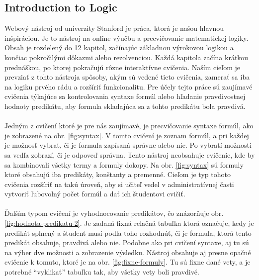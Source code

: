 \subsection{Introduction to Logic}
Webový nástroj od univerzity Stanford \cite{intro_to_logic} je práca, ktorá je našou hlavnou inšpiráciou. Je to nástroj na online výučbu a precvičovanie matematickej logiky. Obsah je rozdelený do 12 kapitol, začínajúc základnou výrokovou logikou a končiac pokročilými dôkazmi alebo rezolvenciou. Každá kapitola začína krátkou prednáškou, po ktorej pokračujú rôzne interaktívne cvičenia. Naším cieľom je prevziať z tohto nástroja spôsoby, akým sú vedené tieto cvičenia, zamerať sa iba na logiku prvého rádu a rozšíriť funkcionalitu. Pre účely tejto práce sú zaujímavé cvičenia týkajúce sa kontrolovania syntaxe formúl alebo hľadanie pravdivostnej hodnoty predikátu, aby formula skladajúca sa z tohto predikátu bola pravdivá.

\paragraph{}
Jedným z cvičení ktoré je pre nás zaujímavé, je precvičovanie syntaxe formúl, ako je zobrazené na obr. \ref{fig:syntax}. V tomto cvičení je zoznam formúl, a pri každej je možnosť vybrať, či je formula zapísaná správne alebo nie. Po vybratí možnosti sa vedľa zobrazí, či je odpoveď správna. Tento nástroj neobsahuje cvičenie, kde by sa kombinovali všetky termy a formuly dokopy. Na obr. \ref{fig:syntax} sú formuly ktoré obsahujú iba predikáty, konštanty a premenné. Cieľom je typ tohoto cvičenia rozšíriť na takú úroveň, aby si učiteľ vedel v administratívnej časti vytvoriť ľubovolný počet formúl a dať ich študentovi cvičiť. 

\paragraph{}
Ďalším typom cvičení je vyhodnocovanie predikátov, čo znázorňuje obr. \ref{fig:hodnota-predikatu-2}. Je zadaná fixná relačná tabuľka ktorá označuje, kedy je predikát splnený a študent musí podľa toho rozhodnúť, či je formula, ktorá tento predikát obsahuje, pravdivá alebo nie. Podobne ako pri cvičení syntaxe, aj tu sú na výber dve možnosti a zobrazenie výsledku. Nástroj obsahuje aj presne opačné cvičenie k tomuto, ktoré je na obr. \ref{fig:fixne-formuly}. Tu sú fixne dané vety, a je potrebné ``vyklikať'' tabuľku tak, aby všetky vety boli pravdivé.

